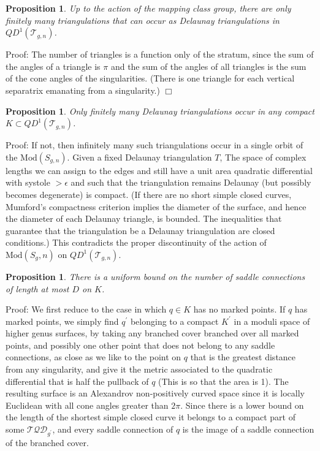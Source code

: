 \documentclass[12pt]{article}
\newtheorem{proposition}[theorem]{Proposition}
\newcommand{\Mod}{\mathrm{Mod}}
\begin{document}
\begin{proposition}Up to the action of the mapping class group, there are only finitely many triangulations that can occur as Delaunay triangulations in $QD^1(\mathcal{T}_{g,n})$.\end{proposition}

\noindent Proof: The number of triangles is a function only of the stratum, since the sum of the angles of a triangle is $\pi$ and the sum of the angles of all triangles is the sum of the cone angles of the singularities. (There is one triangle for each vertical separatrix emanating from a singularity.) $\Box$

\begin{proposition}Only finitely many Delaunay triangulations occur in any compact $K \subset QD^1(\mathcal{T}_{g,n})$.\end{proposition}

\noindent Proof: If not, then infinitely many such triangulations occur in a single orbit of the $\Mod(S_{g,n}).$ Given a fixed Delaunay triangulation $T$, The space of complex lengths we can assign to the edges and still have a unit area quadratic differential with systole $> \epsilon$ and such that the triangulation remains Delaunay (but possibly becomes degenerate) is compact. (If there are no short simple closed curves, Mumford's compactness criterion implies the diameter of the surface, and hence the diameter of each Delaunay triangle, is bounded. The inequalities that guarantee that the triangulation be a Delaunay triangulation are closed conditions.) This contradicts the proper discontinuity of the action of $\Mod(S_g,n)$ on $QD^1(\mathcal{T}_{g,n}).$\\

\begin{proposition}There is a uniform bound on the number of saddle connections of length at most $D$ on $K$.\end{proposition}

\noindent Proof: We first reduce to the case in which $q \in K$ has no marked points. If $q$ has marked points, we simply find $q^\prime$ belonging to a compact $K^\prime$ in a moduli space of higher genus surfaces, by taking any branched cover branched over all marked points, and possibly one other point that does not belong to any saddle connections, as close as we like to the point on $q$ that is the greatest distance from any singularity, and give it the metric associated to the quadratic differential that is half the pullback of $q$ (This is so that the area is 1). The resulting surface is an Alexandrov non-positively curved space since it is locally Euclidean with all cone angles greater than $2\pi$. Since there is a lower bound on the length of the shortest simple closed curve it belongs to a compact part of some $\mathcal{TQD}_{g^\prime}$, and every saddle connection of $q$ is the image of a saddle connection of the branched cover.\\
\end{document}
